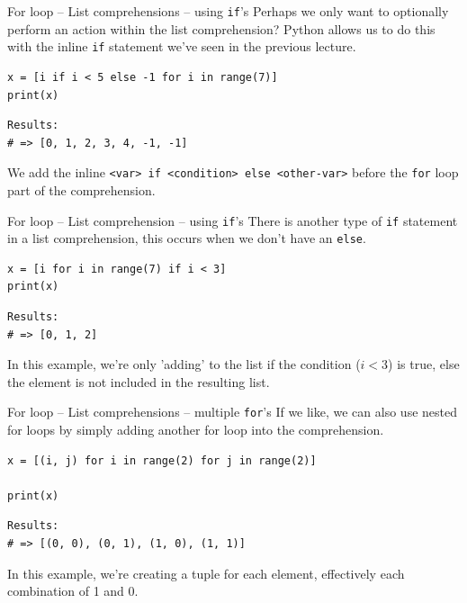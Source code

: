 \documentclass[10pt]{beamer}
\begin{document}
\begin{frame}[label={sec:org5827c18},fragile]{For loop -- List comprehensions -- using \texttt{if}'s}
 Perhaps we only want to optionally perform an action within the list comprehension?
Python allows us to do this with the inline \texttt{if} statement we've seen in the previous lecture.

\begin{verbatim}
x = [i if i < 5 else -1 for i in range(7)]
print(x)
\end{verbatim}

\begin{verbatim}
Results: 
# => [0, 1, 2, 3, 4, -1, -1]
\end{verbatim}


We add the inline \texttt{<var> if <condition> else <other-var>} before the \texttt{for} loop part of
the comprehension.
\end{frame}

\begin{frame}[label={sec:orge11cc64},fragile]{For loop -- List comprehension -- using \texttt{if}'s}
 There is another type of \texttt{if} statement in a list comprehension, this occurs when we
don't have an \texttt{else}.

\begin{verbatim}
x = [i for i in range(7) if i < 3]
print(x)
\end{verbatim}

\begin{verbatim}
Results: 
# => [0, 1, 2]
\end{verbatim}


In this example, we're only 'adding' to the list if the condition (\(i < 3\)) is true,
else the element is not included in the resulting list.
\end{frame}

\begin{frame}[label={sec:org398a952},fragile]{For loop -- List comprehensions -- multiple \texttt{for}'s}
 If we like, we can also use nested for loops by simply adding another for loop into
the comprehension.

\begin{verbatim}
x = [(i, j) for i in range(2) for j in range(2)]

print(x)
\end{verbatim}

\begin{verbatim}
Results: 
# => [(0, 0), (0, 1), (1, 0), (1, 1)]
\end{verbatim}


In this example, we're creating a tuple for each element, effectively each
combination of 1 and 0.
\end{frame}
\end{document}
